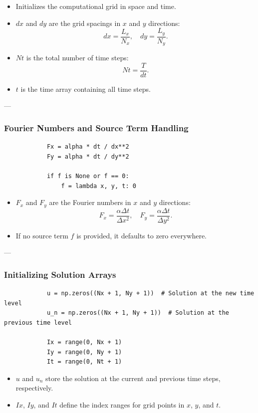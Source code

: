 \documentclass{article}
\begin{document}
		\noindent
		\begin{itemize}
			\item Initializes the computational grid in space and time.
			\item $dx$ and $dy$ are the grid spacings in $x$ and $y$ directions:
			\[
			dx = \frac{L_x}{N_x}, \quad dy = \frac{L_y}{N_y}.
			\]
			\item $Nt$ is the total number of time steps:
			\[
			Nt = \frac{T}{dt}.
			\]
			\item $t$ is the time array containing all time steps.
		\end{itemize}
		
		---
		
		\subsubsection{Fourier Numbers and Source Term Handling}
		\begin{lstlisting}
			Fx = alpha * dt / dx**2
			Fy = alpha * dt / dy**2
			
			if f is None or f == 0:
				f = lambda x, y, t: 0
		\end{lstlisting}
		
		\noindent
		\begin{itemize}
			\item $F_x$ and $F_y$ are the Fourier numbers in $x$ and $y$ directions:
			\[
			F_x = \frac{\alpha \Delta t}{\Delta x^2}, \quad F_y = \frac{\alpha \Delta t}{\Delta y^2}.
			\]
			\item If no source term $f$ is provided, it defaults to zero everywhere.
		\end{itemize}
		
		---
		
		\subsubsection{Initializing Solution Arrays}
		\begin{lstlisting}
			u = np.zeros((Nx + 1, Ny + 1))  # Solution at the new time level
			u_n = np.zeros((Nx + 1, Ny + 1))  # Solution at the previous time level
			
			Ix = range(0, Nx + 1)
			Iy = range(0, Ny + 1)
			It = range(0, Nt + 1)
		\end{lstlisting}
		
		\noindent
		\begin{itemize}
			\item $u$ and $u_n$ store the solution at the current and previous time steps, respectively.
			\item $Ix$, $Iy$, and $It$ define the index ranges for grid points in $x$, $y$, and $t$.
		\end{itemize}
		
\end{document}
